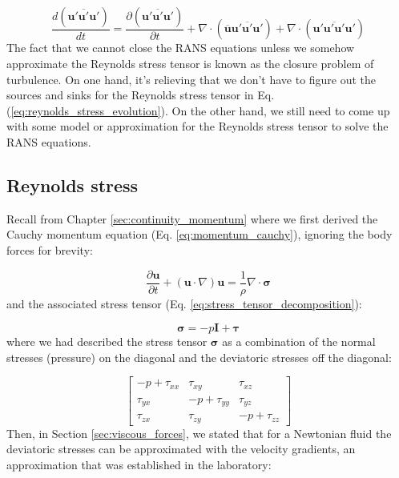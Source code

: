 \documentclass[12pt]{article}
\numberwithin{equation}{section}
\numberwithin{figure}{section}
\numberwithin{table}{section}
\begin{document}
\begin{equation}
  \frac{d \left( \overline{\mathbf{u}' \mathbf{u}' \mathbf{u}'} \right)}{dt} =
  \frac{\partial \left( \overline{\mathbf{u}' \mathbf{u}' \mathbf{u}'} \right)}{\partial t} +
  \nabla \cdot \left( \overline{\mathbf{u}} \overline{\mathbf{u}' \mathbf{u}' \mathbf{u}'} \right) +
  \nabla \cdot \left( \overline{\mathbf{u}' \mathbf{u}' \mathbf{u}' \mathbf{u}'} \right)
\end{equation}
The fact that we cannot close the RANS equations unless we somehow approximate
the Reynolds stress tensor is known as the closure problem of turbulence.
On one hand, it's relieving that we don't have to figure out the sources and
sinks for the Reynolds stress tensor in Eq. (\ref{eq:reynolds_stress_evolution}).
On the other hand, we still need to come up with some model or approximation
for the Reynolds stress tensor to solve the RANS equations.

\subsection{Reynolds stress}

Recall from Chapter \ref{sec:continuity_momentum} where we first derived the
Cauchy momentum equation (Eq. \ref{eq:momentum_cauchy}), ignoring the body forces
for brevity:

\begin{equation}
  \frac{\partial \mathbf{u}}{\partial t} + (\mathbf{u} \cdot \nabla) \mathbf{u} =
  \frac{1}{\rho} \nabla \cdot \boldsymbol{\sigma}
\end{equation}
and the associated stress tensor (Eq. \ref{eq:stress_tensor_decomposition}):

\begin{equation}
  \boldsymbol{\sigma} = -p \mathbf{I} + \boldsymbol{\tau}
\end{equation}
where we had described the stress tensor $\boldsymbol{\sigma}$ as a combination
of the normal stresses (pressure) on the diagonal and the deviatoric stresses
off the diagonal:

\begin{equation}
  \begin{bmatrix}
    -p + \tau_{xx} & \tau_{xy} & \tau_{xz} \\
    \tau_{yx} & -p + \tau_{yy} & \tau_{yz} \\
    \tau_{zx} & \tau_{zy} & -p + \tau_{zz}
  \end{bmatrix}
\end{equation}
Then, in Section \ref{sec:viscous_forces}, we stated that for a Newtonian fluid
the deviatoric stresses can be approximated with the velocity gradients, an
approximation that was established in the laboratory:
\end{document}
